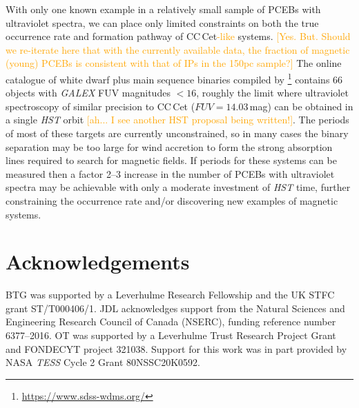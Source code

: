 \documentclass[fleqn,usenatbib]{mnras}
\newcommand{\bgc}[1]{\textcolor{orange}{[#1]}}
\newcommand{\bgs}[1]{\textcolor{orange}{#1}}
\begin{document}







With only one known example in a relatively small sample of PCEBs with ultraviolet spectra, we can place only limited constraints on both the true occurrence rate and formation pathway of CC\,Cet\bgs{-like}
systems. \bgc{Yes. But. Should we re-iterate here that with the currently available data, the fraction of magnetic (young) PCEBs is consistent with that of IPs in the 150pc sample?} The online catalogue of white dwarf plus main sequence binaries compiled by \citet{rebassa-mansergasetal12-1}\footnote{\url{https://www.sdss-wdms.org/}} contains 66 objects with \textit{GALEX} FUV magnitudes $<16$, roughly the limit where ultraviolet spectroscopy of similar precision to CC\,Cet ($FUV=14.03$\,mag) can be obtained in a single \textit{HST} orbit \bgc{ah... I see another HST proposal being written!}. The periods of most of these targets are currently unconstrained, so in many cases the binary separation may be too large for wind accretion to form the strong absorption lines required to search for magnetic fields. If periods for these systems can be measured then a factor 2--3 increase in the number of PCEBs with ultraviolet spectra may be achievable with only a moderate investment of \textit{HST} time, further constraining the occurrence rate and/or discovering new examples of magnetic systems.       





\section*{Acknowledgements}
BTG was supported by a Leverhulme Research Fellowship and the UK STFC grant ST/T000406/1. JDL acknowledges support from the Natural Sciences and Engineering Research Council of Canada (NSERC), funding reference number 6377--2016. OT was supported by a Leverhulme Trust Research Project Grant and FONDECYT project 321038. Support for this work was in part provided by NASA {\em TESS} Cycle 2 Grant 80NSSC20K0592.
\end{document}
